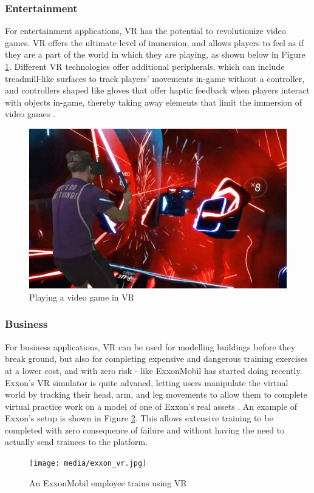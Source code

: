 \subsubsection{Entertainment}
For entertainment applications, VR has the potential to revolutionize video games.
VR offers the ultimate level of immersion, and allows players to feel as if they
are a part of the world in which they are playing, as shown below in Figure \ref{vr:saber}.
Different VR technologies offer additional peripherals, which can include treadmill-like
surfaces to track players' movements in-game without a controller, and controllers
shaped like gloves that offer haptic feedback when players interact with objects in-game,
thereby taking away elements that limit the immersion of video games \cite{vr_peripherals}.

\begin{figure}[h]
    \centering
    \includegraphics[width=.5\linewidth]{media/beatsaber_vr.jpg}
    \caption{Playing a video game in VR \cite{beatsaber_cite}}
    \label{vr:saber}
\end{figure}

\subsubsection{Business}
For business applications, VR can be used for modelling buildings before they break
ground, but also for completing expensive and dangerous training exercises at a lower
cost, and with zero risk - like ExxonMobil has started doing recently.
Exxon's VR simulator is quite advaned, letting users manipulate the 
virtual world by tracking their head, arm, and leg movements to allow them to 
complete virtual practice work on a model of one of Exxon's real assets \cite{exxon_vr}.
An example of Exxon's setup is shown in Figure \ref{vr:exxon}.
This allows extensive training to be completed with zero consequence of failure and
without having the need to actually send trainees to the platform.

\begin{figure}[h]
    \centering
    \texttt{[image: media/exxon\_vr.jpg]}
    \caption{An ExxonMobil employee trains using VR \cite{exxon_vr}}
    \label{vr:exxon}
\end{figure}

